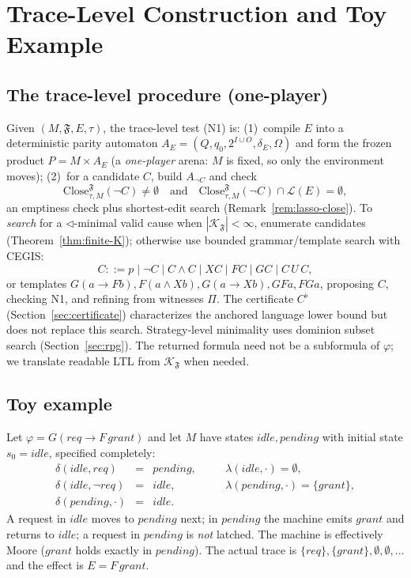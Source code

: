 \documentclass[11pt]{article}
\theoremstyle{remark}
\newcommand{\Close}{\mathrm{Close}}
\newcommand{\Lang}{\mathcal{L}}
\newcommand{\Frame}{\mathfrak{F}}
\begin{document}
\section{Trace-Level Construction and Toy Example}
\label{sec:construction}

\subsection{The trace-level procedure (one-player)}

Given \((M,\Frame,E,\tau)\), the trace-level test (N1) is: (1)~compile \(E\) into
a deterministic parity automaton \(A_E=(Q,q_0,2^{I\cup O},\delta_E,\Omega)\) and
form the frozen product \(P=M\times A_E\) (a \emph{one-player} arena: \(M\) is
fixed, so only the environment moves); (2)~for a candidate \(C\), build
\(A_{\neg C}\) and check
\[
  \Close_{\tau,M}^{\Frame}(\neg C)\neq\emptyset
  \quad\text{and}\quad
  \Close_{\tau,M}^{\Frame}(\neg C)\cap\Lang(E)=\emptyset ,
\]
an emptiness check plus shortest-edit search (Remark~\ref{rem:lasso-close}). To
\emph{search} for a \(\triangleleft\)-minimal valid cause when
\(|\mathcal{K}_{\Frame}|<\infty\), enumerate candidates (Theorem~\ref{thm:finite-K});
otherwise use bounded grammar/template search with CEGIS:
\[
  C ::= p \mid \neg C \mid C\land C \mid X C \mid F C \mid G C \mid C\,U\,C,
\]
or templates \(G(a\to F b),F(a\land X b),G(a\to X b),GF a,FG a\), proposing \(C\),
checking N1, and refining from witnesses \(\Pi\). The certificate \(C^{\flat}\)
(Section~\ref{sec:certificate}) characterizes the anchored language lower bound but
does not replace this search. Strategy-level minimality uses dominion subset search
(Section~\ref{sec:rpg}). The returned formula need not be a subformula of
\(\varphi\); we translate readable LTL from \(\mathcal{K}_{\Frame}\) when needed.

\subsection{Toy example}
\label{sec:toy}

Let \(\varphi=G(req\rightarrow F\,grant)\) and let \(M\) have states
\(idle,pending\) with initial state \(s_0=idle\), specified completely:
\[
\begin{array}{rclcl}
  \delta(idle,req)&=&pending, &\quad& \lambda(idle,\cdot)=\emptyset,\\
  \delta(idle,\neg req)&=&idle, &\quad& \lambda(pending,\cdot)=\{grant\},\\
  \delta(pending,\cdot)&=&idle. & &
\end{array}
\]
A request in \(idle\) moves to \(pending\) next; in \(pending\) the machine emits
\(grant\) and returns to \(idle\); a request in \(pending\) is \emph{not} latched.
The machine is effectively Moore (\(grant\) holds exactly in \(pending\)). The
actual trace is \(\{req\},\{grant\},\emptyset,\emptyset,\ldots\) and the effect is
\(E=F\,grant\).
\end{document}
